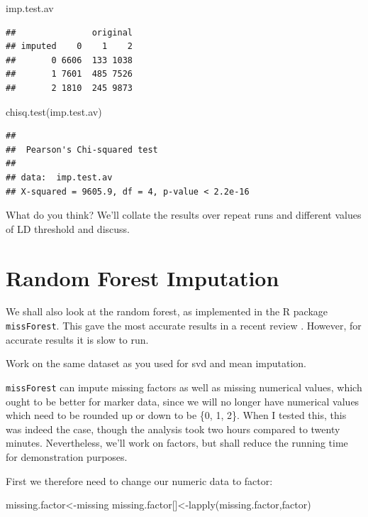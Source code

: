 \documentclass[
]{book}
\newenvironment{Shaded}{\begin{snugshade}}{\end{snugshade}}
\newcommand{\FunctionTok}[1]{\textcolor[rgb]{0.00,0.00,0.00}{#1}}
\newcommand{\NormalTok}[1]{#1}
\newcommand{\OtherTok}[1]{\textcolor[rgb]{0.56,0.35,0.01}{#1}}
\begin{document}
\begin{Shaded}
\begin{Highlighting}[]
\NormalTok{imp.test.av}
\end{Highlighting}
\end{Shaded}

\begin{verbatim}
##               original
## imputed    0    1    2
##       0 6606  133 1038
##       1 7601  485 7526
##       2 1810  245 9873
\end{verbatim}

\begin{Shaded}
\begin{Highlighting}[]
\FunctionTok{chisq.test}\NormalTok{(imp.test.av)}
\end{Highlighting}
\end{Shaded}

\begin{verbatim}
## 
##  Pearson's Chi-squared test
## 
## data:  imp.test.av
## X-squared = 9605.9, df = 4, p-value < 2.2e-16
\end{verbatim}

What do you think? We'll collate the results over repeat runs and different values of LD threshold and discuss.

\hypertarget{random-forest-imputation}{%
\section{Random Forest Imputation}\label{random-forest-imputation}}

We shall also look at the random forest, as implemented in the R package \texttt{missForest}. This gave the most accurate results in a recent review \citet{Rutkoski_2013}. However, for accurate results it is slow to run.

Work on the same dataset as you used for svd and mean imputation.

\texttt{missForest} can impute missing factors as well as missing numerical values, which ought to be better for marker data, since we will no longer have numerical values which need to be rounded up or down to be \{0, 1, 2\}. When I tested this, this was indeed the case, though the analysis took two hours compared to twenty minutes. Nevertheless, we'll work on factors, but shall reduce the running time for demonstration purposes.

First we therefore need to change our numeric data to factor:

\begin{Shaded}
\begin{Highlighting}[]
\NormalTok{missing.factor}\OtherTok{\textless{}{-}}\NormalTok{missing}
\NormalTok{missing.factor[]}\OtherTok{\textless{}{-}}\FunctionTok{lapply}\NormalTok{(missing.factor,factor)}
\end{Highlighting}
\end{Shaded}
\end{document}
